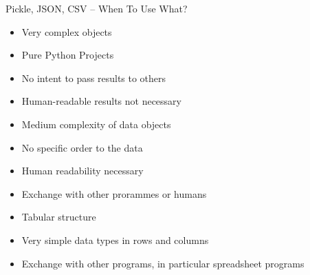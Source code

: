 \begin{frame}[fragile]{Pickle, JSON, CSV -- When To Use What?}
%
\begin{tcbraster}[raster columns=3,
                  raster equal height,
                  nobeforeafter,
                  raster column skip=0.5cm]
\begin{tcolorbox}[title=Pickle]
\begin{itemize}
\item Very complex objects
\item Pure Python Projects
\item No intent to pass results to others
\item Human-readable results not necessary
\end{itemize}
\end{tcolorbox}
%
\begin{tcolorbox}[title=JSON]
\begin{itemize}
\item Medium complexity of data objects
\item No specific order to the data
\item Human readability necessary
\item Exchange with other prorammes or humans
\end{itemize}
\end{tcolorbox}
%
\begin{tcolorbox}[title=CSV]
\begin{itemize}
\item Tabular structure
\item Very simple data types in rows and columns
\item Exchange with other programs, in particular spreadsheet programs
\end{itemize}
\end{tcolorbox}
\end{tcbraster}
%
\end{frame}